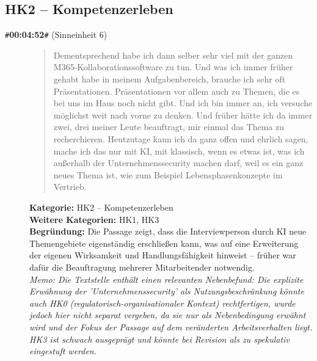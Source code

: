 \subsection*{HK2 -- Kompetenzerleben}

\begin{description}
  \item[\texttt{\#}\textbf{00:04:52}\texttt{\#} (Sinneinheit 6)]
  \begin{quote}
  Dementsprechend habe ich dann selber sehr viel mit der ganzen M365-Kollaborationssoftware zu tun. Und was ich immer früher gehabt habe in meinem Aufgabenbereich, brauche ich sehr oft Präsentationen. Präsentationen vor allem auch zu Themen, die es bei uns im Haus noch nicht gibt. Und ich bin immer an, ich versuche möglichst weit nach vorne zu denken. Und früher hätte ich da immer zwei, drei meiner Leute beauftragt, mir einmal das Thema zu recherchieren. Heutzutage kann ich da ganz offen und ehrlich sagen, mache ich das nur mit KI, mit klassisch, wenn es etwas ist, was ich außerhalb der Unternehmenssecurity machen darf, weil es ein ganz neues Thema ist, wie zum Beispiel Lebensphasenkonzepte im Vertrieb.
  \end{quote}
  \textbf{Kategorie:} HK2 -- Kompetenzerleben\\
  \textbf{Weitere Kategorien:} HK1, HK3\\
  \textbf{Begr\"undung:} Die Passage zeigt, dass die Interviewperson durch KI neue Themengebiete eigenständig erschließen kann, was auf eine Erweiterung der eigenen Wirksamkeit und Handlungsfähigkeit hinweist – früher war dafür die Beauftragung mehrerer Mitarbeitender notwendig.
  \\\textit{Memo: Die Textstelle enthält einen relevanten Nebenbefund: Die explizite Erwähnung der 'Unternehmenssecurity' als Nutzungsbeschränkung könnte auch HK0 (regulatorisch-organisationaler Kontext) rechtfertigen, wurde jedoch hier nicht separat vergeben, da sie nur als Nebenbedingung erwähnt wird und der Fokus der Passage auf dem veränderten Arbeitsverhalten liegt. HK3 ist schwach ausgeprägt und könnte bei Revision als zu spekulativ eingestuft werden.}
\end{description}
\medskip

